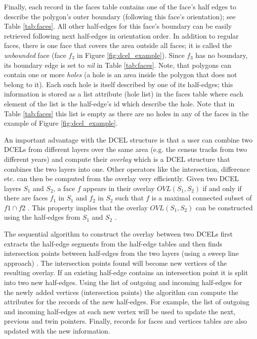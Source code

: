 Finally, each record in the faces table contains one of the face's half edges to describe the polygon's outer boundary (following this face's orientation); see Table \ref{tab:faces}. 
All other half-edges for this face's boundary can be easily retrieved following next half-edges in orientation order.
In addition to regular faces, there is one face that covers the area outside all faces; it is called the  \textit{unbounded} face (face $f_3$ in Figure \ref{fig:dcel_example}). 
Since $f_3$ has no boundary, its boundary edge is set to \textit{nil} in Table \ref{tab:faces}.
Note, that polygons can contain one or more \textit{holes} (a hole is an area inside the polygon that does not belong to it). 
Each such hole is itself described by one of its half-edges; this information is stored as a list attribute (hole list) in the faces table where each element of the list is the half-edge's id which describe the hole. Note that in Table \ref{tab:faces} this list is empty as there are no holes in any of the faces in the example of Figure \ref{fig:dcel_example}. 

An important advantage with the DCEL structure is that a user can combine two DCELs from different layers over the same area (e.g. the census tracks from two
different years) and compute their \textit{overlay} which is a DCEL structure that combines the two layers into one. Other operators like the intersection,
difference etc. can then be computed from the overlay very efficiently.
Given two DCEL layers $S_1$ and $S_2$, a face $f$ appears in their overlay  $OVL(S_1, S_2)$ if and only if there are faces $f_1$ in $S_1$ and $f_2$ in $S_2$ such that $f$ is a maximal connected subset of $f1 \cap f2$ \cite{berg_computational_2008}.  
This property implies that the overlay $OVL(S_1, S_2)$ can be constructed using the half-edges from $S_1$ and $S_2$ . 

The sequential algorithm \cite{fogel_cgal_2012} to construct the overlay between two DCELs first extracts the half-edge segments from the half-edge tables and then finds intersection points between half-edges from the two layers (using a sweep line approach) \cite{berg_computational_2008}. 
The intersection points found will become new vertices of the resulting overlay. 
If an existing half-edge contains an intersection point it is split into two new half-edges. 
Using the list of outgoing and incoming half-edges for the newly added vertices (intersection points) the algorithm can compute the attributes for the records of the new half-edges. For example, the list of outgoing and incoming half-edges at each new vertex will be used to update the next, previous and twin pointers. Finally, records for faces and vertices tables are also updated with the new information. 

